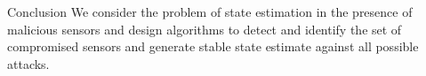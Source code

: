 \documentclass[10pt]{beamer}
\begin{document}
% 

\begin{frame}{Conclusion}
  We consider the problem of state estimation in the presence of malicious sensors and design algorithms to detect and identify the set of compromised sensors and generate stable state estimate against all possible attacks.
\end{frame}
\end{document}
